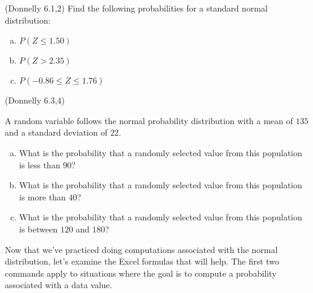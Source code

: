\documentclass[12pt, letterpaper]{article}
\newcounter{exercise}
\theoremstyle{definition}
\begin{document}
\newpage

\begin{exercise} (Donnelly 6.1,2)  
Find the following probabilities for a standard normal
 distribution:

\end{exercise}

\begin{enumerate}[(a)]

\item $P(Z\leq 1.50)$

\vfill

\item $P(Z>2.35)$

\vfill

\item $P(-0.86\leq Z\leq 1.76)$

\vfill

\end{enumerate}


\newpage


\begin{exercise}  (Donnelly 6.3,4)

A random variable follows the normal probability distribution with a mean of $135$ and a standard deviation of $22$.

\end{exercise}


\begin{enumerate}[(a)]

\item What is the probability that a randomly selected value from this population is less than $90$?

\vfill

\item What is the probability that a randomly selected value from this population is more than $40$?

\vfill

\item What is the probability that a randomly selected value from this population is between $120$ and $180$?

\vfill

\end{enumerate}


\newpage


\noindent Now that we've practiced doing computations associated with the normal distribution, let's examine the Excel formulas that will help.  The first two commands apply to situations where the goal is to compute a probability associated with a data value.
\end{document}
